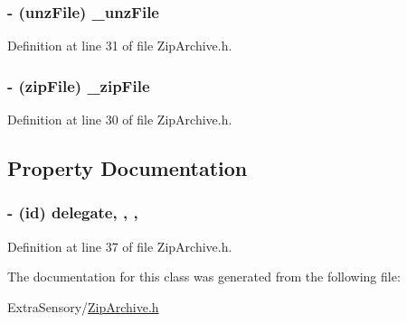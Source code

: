\hypertarget{interface_zip_archive_aef1fdacfc0ed02ab4735cbc1f631ad22}{
\subsubsection[{\+\_\+unz\+File}]{\setlength{\rightskip}{0pt plus 5cm}-\/ ({\bf unz\+File}) \+\_\+unz\+File\hspace{0.3cm}{\ttfamily [private]}}}\label{interface_zip_archive_aef1fdacfc0ed02ab4735cbc1f631ad22}


Definition at line 31 of file Zip\+Archive.\+h.

\hypertarget{interface_zip_archive_aef981226e267166499dd00261da48a11}{
\subsubsection[{\+\_\+zip\+File}]{\setlength{\rightskip}{0pt plus 5cm}-\/ ({\bf zip\+File}) \+\_\+zip\+File\hspace{0.3cm}{\ttfamily [private]}}}\label{interface_zip_archive_aef981226e267166499dd00261da48a11}


Definition at line 30 of file Zip\+Archive.\+h.



\subsection{Property Documentation}
\hypertarget{interface_zip_archive_a072993638f1440f3781868317f8cb97c}{
\subsubsection[{delegate}]{\setlength{\rightskip}{0pt plus 5cm}-\/ (id) delegate\hspace{0.3cm}{\ttfamily [read]}, {\ttfamily [write]}, {\ttfamily [nonatomic]}, {\ttfamily [retain]}}}\label{interface_zip_archive_a072993638f1440f3781868317f8cb97c}


Definition at line 37 of file Zip\+Archive.\+h.



The documentation for this class was generated from the following file\+:\begin{DoxyCompactItemize}
\item 
Extra\+Sensory/\hyperlink{_zip_archive_8h}{Zip\+Archive.\+h}\end{DoxyCompactItemize}

